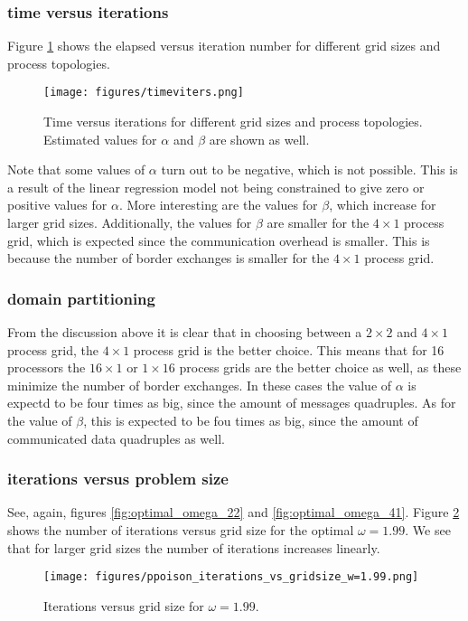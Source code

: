 \subsubsection{time versus iterations}
Figure \ref{fig:timeviters} shows the elapsed versus iteration number for different grid sizes and process topologies.
\begin{figure}[H]
    \centering
    \texttt{[image: figures/timeviters.png]}
    \caption{Time versus iterations for different grid sizes and process topologies. 
    Estimated values for $\alpha$ and $\beta$ are shown as well.}
    \label{fig:timeviters}
\end{figure}
Note that some values of $\alpha$ turn out to be negative, which is not possible.
This is a result of the linear regression model not being constrained to give zero or positive values for $\alpha$.
More interesting are the values for $\beta$, which increase for larger grid sizes. Additionally, the
values for $\beta$ are smaller for the $4\times1$ process grid, which is expected since the communication overhead is smaller.
This is because the number of border exchanges is smaller for the $4\times1$ process grid.

\subsubsection{domain partitioning}
From the discussion above it is clear that in choosing between a $2\times2$ and $4\times1$ process grid, the $4\times1$ process grid is the better choice.
This means that for 16 processors the $16\times1$ or $1\times16$ process grids are the better choice as well, 
as these minimize the number of border exchanges. 
In these cases the value of $\alpha$ is expectd to be four times as big, since the amount of messages quadruples.
As for the value of $\beta$, this is expected to be fou times as big, since the amount of communicated data quadruples as well.

\subsubsection{iterations versus problem size}
See, again, figures \ref{fig:optimal_omega_22} and \ref{fig:optimal_omega_41}. Figure \ref{fig:iterations_vs_problem_size} shows the number of 
iterations versus grid size for the optimal $\omega=1.99$. We see that for larger grid sizes the number of iterations increases linearly.

\begin{figure}
    \centering
    \texttt{[image: figures/ppoison\_iterations\_vs\_gridsize\_w=1.99.png]}
    \caption{Iterations versus grid size for $\omega=1.99$.}
    \label{fig:iterations_vs_problem_size}
\end{figure}

